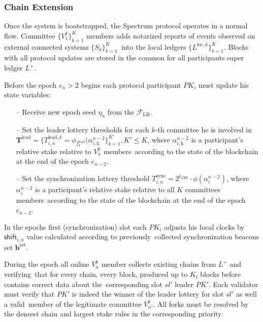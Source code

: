 \subsubsection{Chain Extension}\label{subsubsec:chain-extension}
Once the system is bootstrapped, the Spectrum protocol operates in a normal flow.
Committee $\{V^k_1\}_{k=1}^K$ members adds notarized reports of events observed on external connected systems $\{S_k\}_{k=1}^K$\
into the local ledgers $\{L^{\text{loc}, k}\}_{k=1}^K$.
Blocks with all protocol updates are stored in the common for all participants super ledger $L^+$.
\begin{legal}
    \item Before the epoch $e_n > 2$ begins each protocol participant $PK_i$ must update his state variables:
    \begin{itemize}
        \item[--] Receive new epoch seed $\eta_n$ from the ${\mathcal{F}}_{\text{LB}}$.
        \item [--] Set the leader lottery thresholds for each $k$-th committee he is involved in $\mathbf{T}^{\text{lead}} = \{T_{i, n}^{\text{lead}, k} = \phi_{f^{\text{lead}}_k}(\alpha^{n-2}_{i, \text{k}}\}_{k=1}^{K'}, K' \leq K$,
        where $\alpha^{n-2}_{i, \text{k}}$ is a participant's relative stake relative to $V^k_n$ members\
        according to the state of the blockchain at the end of the epoch $e_{n-2}$.
        \item [--] Set the synchronization lottery threshold $T^{\text{sync}}_{i, n} = 2^{l_{\text{VRF}}}\cdot\phi(\alpha^{n-2}_{i})$,
        where $\alpha^{n-2}_{i}$ is a participant's relative stake relative to all $K$ committees members\
        according to the state of the blockchain at the end of the epoch $e_{n-2}$.
    \end{itemize}

    \item In the epochs first (synchronization) slot each $PK_i$ adjusts his local clocks by $\textsf{shift}_{i, n}$ value calculated according to previously\
    collected synchronization beacons set $\mathbf{b}^{\text{set}}$.

    \item During the epoch all online $V^k_n$ member collects existing chains from $L^+$ and verifying\
    that for every chain, every block, produced up to $K_{\text{f}}$ blocks before contains correct data about the\
    corresponding slot $sl'$ leader $PK'$.
    Each validator must verify that $PK'$ is indeed the winner of the leader lottery for slot $sl'$ as well a valid\
    member of the legitimate committee $V^k_{n'}$.
    All forks must be resolved by the densest chain and largest stake rules in the corresponding priority.


\end{legal}
